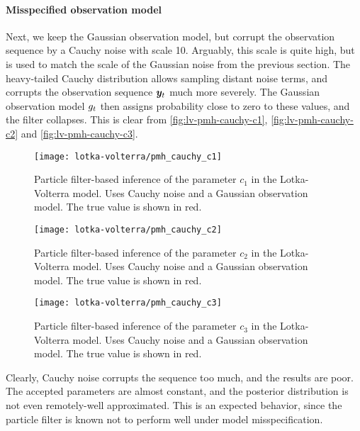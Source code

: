 \paragraph{Misspecified observation model}
Next, we keep the Gaussian observation model, but corrupt the observation sequence by a Cauchy noise with scale 10. Arguably, this scale is quite high, but is used to match the scale of the Gaussian noise from the previous section. The heavy-tailed Cauchy distribution allows sampling distant noise terms, and corrupts the observation sequence $\bm{y}_t$ much more severely. The Gaussian observation model $g_t$ then assigns probability close to zero to these values, and the filter collapses. This is clear from \autoref{fig:lv-pmh-cauchy-c1}, \autoref{fig:lv-pmh-cauchy-c2} and \autoref{fig:lv-pmh-cauchy-c3}.

\begin{figure}[htp]
    \centering
    \texttt{[image: lotka-volterra/pmh\_cauchy\_c1]}
    \caption{Particle filter-based inference of the parameter $c_1$ in the Lotka-Volterra model. Uses Cauchy noise and a Gaussian observation model. The true value is shown in red.}
    \label{fig:lv-pmh-cauchy-c1}
\end{figure}

\begin{figure}[htp]
    \centering
    \texttt{[image: lotka-volterra/pmh\_cauchy\_c2]}
    \caption{Particle filter-based inference of the parameter $c_2$ in the Lotka-Volterra model. Uses Cauchy noise and a Gaussian observation model. The true value is shown in red.}
    \label{fig:lv-pmh-cauchy-c2}
\end{figure}

\begin{figure}[htp]
    \centering
    \texttt{[image: lotka-volterra/pmh\_cauchy\_c3]}
    \caption{Particle filter-based inference of the parameter $c_3$ in the Lotka-Volterra model. Uses Cauchy noise and a Gaussian observation model. The true value is shown in red.}
    \label{fig:lv-pmh-cauchy-c3}
\end{figure}

Clearly, Cauchy noise corrupts the sequence too much, and the results are poor. The accepted parameters are almost constant, and the posterior distribution is not even remotely-well approximated. This is an expected behavior, since the particle filter is known not to perform well under model misspecification.



